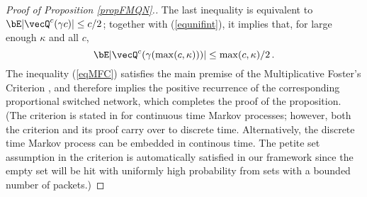 \documentclass{amsart}
\begin{document}
\begin{proof}[Proof of Proposition \ref{propFMQN}.]
The last inequality is equivalent to 
$\bE |\vecQ^{c}(\gamma c)|   \le c/2$; together with (\ref{equnifint}), it implies that, for large enough $\kappa$ and all $c$, 
\begin{equation}
\label{eqMFC}
\bE |\vecQ^{c}(\gamma (\max(c,\kappa)))|   \le \max(c,\kappa)/2 \,.
\end{equation}
The inequality (\ref{eqMFC}) satisfies the main premise of the Multiplicative Foster\rq{}s Criterion \cite[Proposition 4.6, (4.28)]{Br08}, and therefore implies the positive recurrence of the corresponding
proportional switched network, which completes the proof of the proposition.  
(The criterion is stated in \cite{Br08} for continuous time
Markov processes; however, both the criterion and its proof carry over to discrete time.  Alternatively, the
discrete time Markov process can be embedded in continous time.  The petite set assumption in the criterion is automatically satisfied in our framework since the empty set will be hit with uniformly high
probability from sets with a bounded number of packets.)
\iffalse
Since the state space is discrete, we have that for any $K>0$ the set
$$F_K = \{ x \in \mathcal X: ||x|| \leq K\}$$
is finite.
From \eqref{eq:Q.hitting.time.of.zero} and \eqref{eq:fluid.scaled.processes} we have that, with $T=c_5$
$$
\limsup_{\vecQ(0) \to\infty} \bE_{\vecQ(0)}[||\bar X(T)||] 
= \limsup_{\vecQ(0)\to\infty} \frac{\bE_{\vecQ(0)}[||\bar X(|\vecQ(0)| \, T)||] }{|\vecQ(0)|} = 0 \ .
$$
The property follows from a derivate result of the Foster's criterion, see Corollary 9.8, page 259 in \cite{Ro03}.
\fi
\end{proof}
\end{document}
